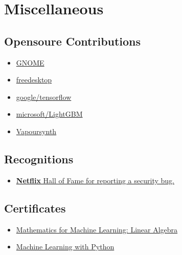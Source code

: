 \documentclass{article}
\begin{document}
\section{Miscellaneous}


 \subsection{Opensoure Contributions}
 \begin{multicols}{4}
 \begin{itemize}
     \item \href{https://gitlab.gnome.org/jkotra}{GNOME}
     \item \href{https://gitlab.freedesktop.org/jkotra}{freedesktop}
     \item \href{https://github.com/tensorflow/tensorflow}{google/tensorflow}
     \item \href{https://github.com/microsoft/LightGBM}{microsoft/LightGBM}
     \item \href{https://github.com/vapoursynth/vapoursynth}{Vapoursynth}
 \end{itemize}
\end{multicols}

\subsection{Recognitions}

\begin{itemize}
    \item \href{https://bugcrowd.com/netflix/hall-of-fame}{\textbf{Netflix} Hall of Fame for reporting a security bug.}
\end{itemize}


\subsection{Certificates}

\begin{itemize}
    \item \href{https://www.coursera.org/account/accomplishments/certificate/E2FE7HNXWP8J}{Mathematics for Machine Learning: Linear Algebra}
    \item \href{https://www.coursera.org/account/accomplishments/certificate/QDPTGAQSXZNM}{Machine Learning with Python}
\end{itemize}
\end{document}
